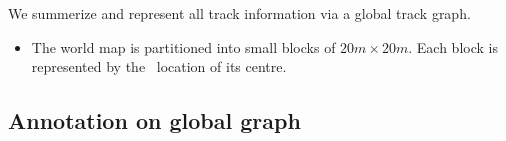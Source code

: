 We summerize and represent all track information via a global track graph.
\begin{itemize}
	\item The world map is partitioned into small blocks of $20m\times20m$. Each block is represented by the \gps\ location of its centre.
\end{itemize}




\subsection{Annotation on global graph}



